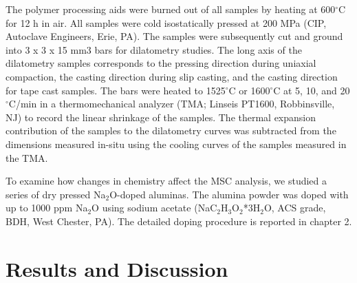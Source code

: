 The polymer processing aids were burned out of all samples by heating at 600$^{\circ}$C for 12 h in air. All samples were cold isostatically pressed at 200 MPa (CIP, Autoclave Engineers, Erie, PA). The samples were subsequently cut and ground into 3 x 3 x 15 mm3 bars for dilatometry studies. The long axis of the dilatometry samples corresponds to the pressing direction during uniaxial compaction, the casting direction during slip casting, and the casting direction for tape cast samples. The bars were heated to 1525$^{\circ}$C or 1600$^{\circ}$C at 5, 10, and 20$^{\circ}$C/min in a thermomechanical analyzer (TMA; Linseis PT1600, Robbinsville, NJ) to record the linear shrinkage of the samples. The thermal expansion contribution of the samples to the dilatometry curves was subtracted from the dimensions measured in-situ using the cooling curves of the samples measured in the TMA.

To examine how changes in chemistry affect the MSC analysis, we studied a series of dry pressed Na$_{2}$O-doped aluminas. The alumina powder was doped with up to 1000 ppm Na$_{2}$O using sodium acetate (NaC$_{2}$H$_{3}$O$_{2}$*3H$_{2}$O, ACS grade, BDH, West Chester, PA). The detailed doping procedure is reported in chapter 2.


\section{Results and Discussion}

